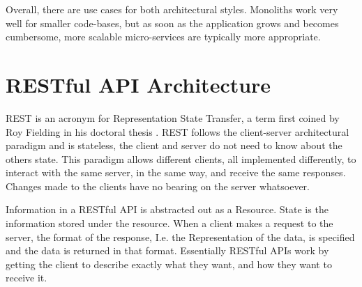 Overall, there are use cases for both architectural styles. Monoliths work very well for smaller code-bases, but as soon as the application grows and becomes cumbersome, more scalable micro-services are typically more appropriate.

\section{RESTful API Architecture}

REST is an acronym for Representation State Transfer, a term first coined by Roy Fielding in his doctoral thesis \cite{fielding}. REST follows the client-server architectural paradigm and is stateless, the client and server do not need to know about the others state. This paradigm allows different clients, all implemented differently, to interact with the same server, in the same way, and receive the same responses. Changes made to the clients have no bearing on the server whatsoever.

Information in a RESTful API is abstracted out as a Resource. State is the information stored under the resource. When a client makes a request to the server, the format of the response, I.e. the Representation of the data, is specified and the data is returned in that format. Essentially RESTful APIs work by getting the client to describe exactly what they want, and how they want to receive it.
